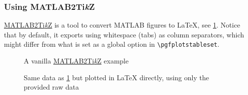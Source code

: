 
\subsubsection{Using MATLAB2Ti\textit{k}Z}

\href{https://github.com/matlab2tikz/matlab2tikz}{MATLAB2Ti\textit{k}Z} is a tool to
convert MATLAB figures to \LaTeX{}, see \cref{fig:matlab2tikz_vanilla}.
Notice that by default, it exports using whitespace (tabs) as column separators,
which might differ from what is set as a global option in \verb|\pgfplotstableset|.

\begin{figure}[tbp]
    \ContinuedFloat*
    \centering
    \caption[MATLAB2Ti\textit{k}Z example]{%
        A vanilla \href{https://github.com/matlab2tikz/matlab2tikz}{MATLAB2Ti\textit{k}Z}
        example%
    }
    \label{fig:matlab2tikz_vanilla}
\end{figure}

\begin{figure}[tbp]
    \ContinuedFloat
    \centering
    \caption[Plotting in \LaTeX{} with provided data]{%
        Same data as \cref{fig:matlab2tikz_vanilla} but plotted in \LaTeX{} directly, using only the provided raw data%
    }
    \label{fig:matlab2tikz_pgfplots}
\end{figure}

